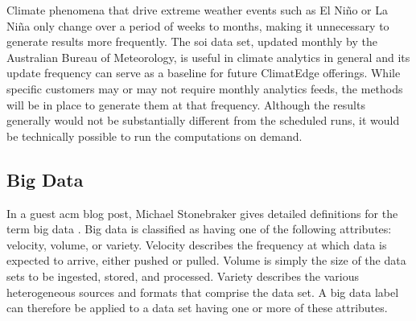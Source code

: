 Climate phenomena that drive extreme weather events such as El Niño or La Niña only change over a period of weeks to months, making it unnecessary to generate results more frequently. The \gls{soi} data set, updated monthly by the Australian Bureau of Meteorology, is useful in climate analytics in general and its update frequency can serve as a baseline for future ClimatEdge offerings. While specific customers may or may not require monthly analytics feeds, the methods will be in place to generate them at that frequency. Although the results generally would not be substantially different from the scheduled runs, it would be technically possible to run the computations on demand.
\subsection{Big Data}
In a guest \gls{acm} blog post, Michael Stonebraker gives detailed definitions for the term big data \cite{stonebraker}. Big data is classified as having one of the following attributes: velocity, volume, or variety. Velocity describes the frequency at which data is expected to arrive, either pushed or pulled. Volume is simply the size of the data sets to be ingested, stored, and processed. Variety describes the various heterogeneous sources and formats that comprise the data set. A big data label can therefore be applied to a data set having  one or more of these attributes.\\

